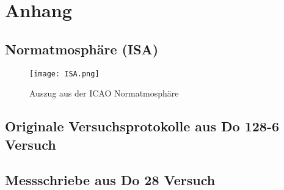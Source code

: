\newpage
\chapter{Anhang}
\section{Normatmosphäre (ISA)}

\begin{figure}[h]
	\begin{center}
		\texttt{[image: ISA.png]} 
		\caption{Auszug aus der ICAO Normatmosphäre \cite{FM1-skript}}
	\end{center}
\end{figure}
\newpage

\section{Originale Versuchsprotokolle aus Do 128-6 Versuch}
\newpage

\section{Messschriebe aus Do 28 Versuch}

